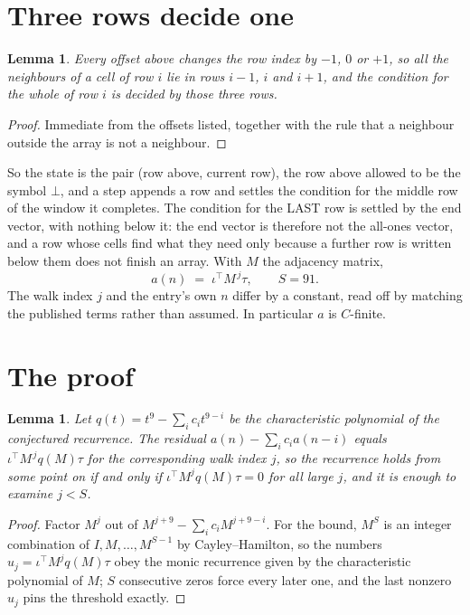 \documentclass[11pt,a4paper]{article}
\theoremstyle{plain}
\newtheorem{lemma}[theorem]{Lemma}
\theoremstyle{definition}
\begin{document}
\section{Three rows decide one}

\begin{lemma}\label{lem:win}
Every offset above changes the row index by $-1$, $0$ or $+1$, so all the neighbours of a cell
of row $i$ lie in rows $i-1$, $i$ and $i+1$, and the condition for the whole of row $i$ is
decided by those three rows.
\end{lemma}

\begin{proof}
Immediate from the offsets listed, together with the rule that a neighbour outside the array is
not a neighbour.
\end{proof}

So the state is the pair (row above, current row), the row above allowed to be the symbol
$\bot$, and a step appends a row and settles the condition for the middle row of the window it
completes. The condition for the LAST row is settled by the end vector, with nothing below it:
the end vector is therefore not the all-ones vector, and a row whose cells find what they need
only because a further row is written below them does not finish an array. With $M$ the
adjacency matrix,
\[
a(n)\;=\;\iota^{\!\top}M^{\,j}\tau ,\qquad S=91.
\]
The walk index $j$ and the entry's own $n$ differ by a constant, read off by matching the
published terms rather than assumed. In particular $a$ is $C$-finite.

\section{The proof}

\begin{lemma}\label{lem:crit}
Let $q(t)=t^{9}-\sum_i c_it^{9-i}$ be the characteristic polynomial of the
conjectured recurrence. The residual $a(n)-\sum_ic_ia(n-i)$ equals
$\iota^{\!\top}M^{\,j}q(M)\tau$ for the corresponding walk index $j$, so the recurrence
holds from some point on if and only if $\iota^{\!\top}M^{j}q(M)\tau=0$ for all large $j$,
and it is enough to examine $j<S$.
\end{lemma}

\begin{proof}
Factor $M^{j}$ out of $M^{j+9}-\sum_ic_iM^{j+9-i}$. For the bound, $M^{S}$
is an integer combination of $I,M,\dots,M^{S-1}$ by Cayley--Hamilton, so the numbers
$u_j=\iota^{\!\top}M^{j}q(M)\tau$ obey the monic recurrence given by the characteristic
polynomial of $M$; $S$ consecutive zeros force every later one, and the last nonzero $u_j$
pins the threshold exactly.
\end{proof}
\end{document}
